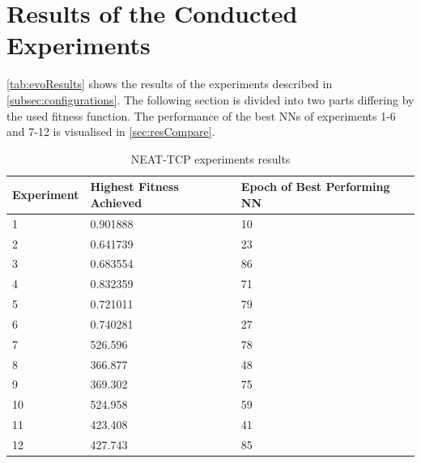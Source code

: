 \section{Results of the Conducted Experiments}\label{sec:expResults}
\autoref{tab:evoResults} shows the results of the experiments described in \autoref{subsec:configurations}. The following section is divided into two parts differing by the used fitness function. The performance of the best NNs of experiments 1-6 and 7-12 is visualised in \autoref{sec:resCompare}.
\begin{table}[h]
\centering
\caption{NEAT-TCP experiments results}
\begin{tabular}{|l|l|l|}\hline
Experiment & Highest Fitness Achieved & Epoch of Best Performing NN  \\ \hline
    1       &              0.901888            &             10          \\ \hline
    2      &                0.641739          &               23         \\ \hline
    3      &                 0.683554         &               86        \\ \hline
    4       &               0.832359           &           71           \\ \hline
    5      &                  0.721011        &              79          \\ \hline
    6      &                0.740281          &              27         \\ \hline
    7       &            526.596              &              78         \\ \hline
    8      &              366.877            &              48          \\ \hline
    9      &             369.302             &            75           \\ \hline
  10       &              524.958            &              59         \\ \hline
  11      &               423.408           &            41            \\ \hline
   12      &             427.743             &           85            \\ \hline
\end{tabular}

\label{tab:evoResults}
\end{table}
